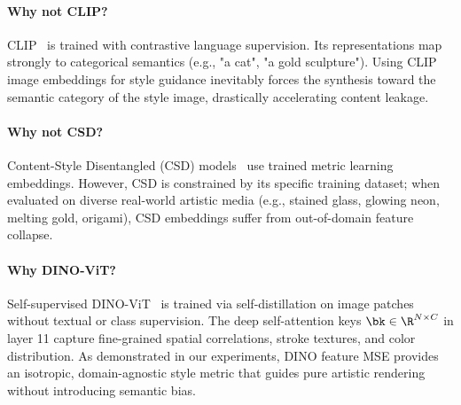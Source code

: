 \paragraph{Why not CLIP?}
CLIP~\cite{radford2021learning} is trained with contrastive language supervision. Its representations map strongly to categorical semantics (e.g., "a cat", "a gold sculpture"). Using CLIP image embeddings for style guidance inevitably forces the synthesis toward the semantic category of the style image, drastically accelerating content leakage.

\paragraph{Why not CSD?}
Content-Style Disentangled (CSD) models~\cite{rout2024rbmodulation} use trained metric learning embeddings. However, CSD is constrained by its specific training dataset; when evaluated on diverse real-world artistic media (e.g., stained glass, glowing neon, melting gold, origami), CSD embeddings suffer from out-of-domain feature collapse.

\paragraph{Why DINO-ViT?}
Self-supervised DINO-ViT~\cite{caron2021emerging,oquab2023dinov2} is trained via self-distillation on image patches without textual or class supervision. The deep self-attention keys $\bk \in \R^{N \times C}$ in layer 11 capture fine-grained spatial correlations, stroke textures, and color distribution. As demonstrated in our experiments, DINO feature MSE provides an isotropic, domain-agnostic style metric that guides pure artistic rendering without introducing semantic bias.
